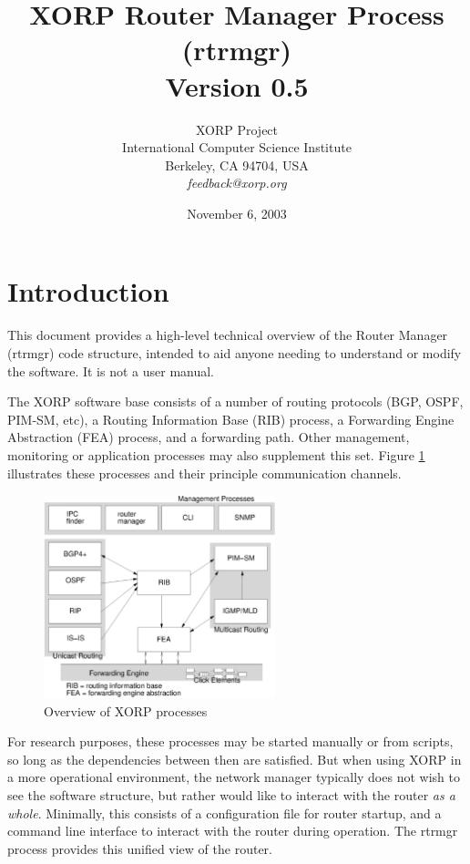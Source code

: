 \documentclass[11pt]{article}
\title{XORP Router Manager Process (rtrmgr) \\
\vspace{1ex}
Version 0.5}
\author{ XORP Project					\\
	 International Computer Science Institute	\\
	 Berkeley, CA 94704, USA			\\
	 {\it feedback@xorp.org}
}
\date{November 6, 2003}
\begin{document}
\maketitle                            
\section{Introduction}
This document provides a high-level technical overview of the Router
Manager (rtrmgr) code structure, intended to aid anyone needing to
understand or modify the software.   It is not a user manual.

The XORP software base consists of a number of routing protocols (BGP,
OSPF, PIM-SM, etc), a Routing Information Base (RIB) process, a
Forwarding Engine Abstraction (FEA) process, and a forwarding path.
Other management, monitoring or application processes may also
supplement this set.  Figure \ref{overview} illustrates these
processes and their principle communication channels.

\begin{figure}[htb]
\centerline{\includegraphics[width=0.6\textwidth]{figs/processes3}}
\vspace{.05in}
\caption{\label{overview}Overview of XORP processes}
\end{figure}

For research purposes, these processes may be started manually or from
scripts, so long as the dependencies between then are satisfied.  But
when using XORP in a more operational environment, the network manager
typically does not wish to see the software structure, but rather
would like to interact with the router {\it as a whole}.  Minimally, this
consists of a configuration file for router startup, and a command
line interface to interact with the router during operation.  The
rtrmgr process provides this unified view of the router.
\end{document}
